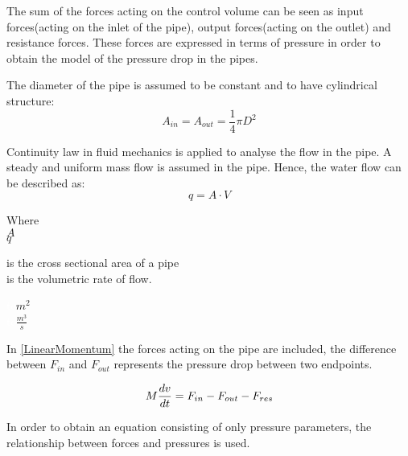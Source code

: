 The sum of the forces acting on the control volume can be seen as input forces(acting on the inlet of the pipe), output forces(acting on the outlet) and resistance forces.  
These forces are expressed in terms of pressure in order to obtain the model of the pressure drop in the pipes. 

The diameter of the pipe is assumed to be constant and to have cylindrical structure:
\begin{equation}
  A_{in} = A_{out} = \frac{1}{4}\pi D^{2}
\end{equation}

Continuity law in fluid mechanics is applied to analyse the flow in the pipe.\cite{Hunt_Fluidmechanics} A steady and uniform mass flow is assumed in the pipe. Hence, the water flow can be described as: 
\begin{equation}
  q=A \cdot V
	\label{EquationOfContinuity}
\end{equation}

 \begin{minipage}[t]{0.20\textwidth}
Where\\
\hspace*{8mm} $A$ \\
\hspace*{8mm} $q$ 
\end{minipage}
\begin{minipage}[t]{0.68\textwidth}
\vspace*{2mm}
is the cross sectional area of a pipe\\
is the volumetric rate of flow.

\end{minipage}
\begin{minipage}[t]{0.10\textwidth}
\vspace*{2mm}
\textcolor{White}{te}$\unit{m^{2}}$\\
\textcolor{White}{te}$\unit{\frac{m^{3}}{s}}$
\end{minipage}

 In \eqref{LinearMomentum} the forces acting on the pipe are included, the difference between $F_{in}$ and $F_{out}$ represents the pressure drop 
 between two endpoints.

\begin{equation}
  M \frac{dv}{dt} = F_{in} - F_{out} - F_{res} \\
  \label{LinearMomentum}
\end{equation}

In order to obtain an equation consisting of only pressure parameters, the relationship between forces and pressures is used.



